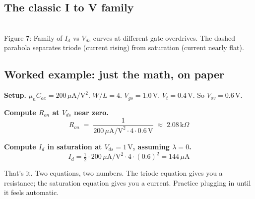 \documentclass[11pt]{article}
\begin{document}
\subsection{The classic I to V family}

\begin{center}
\\
{\small Figure 7: Family of $I_d$ vs $V_{ds}$ curves at different gate overdrives. The dashed parabola separates triode (current rising) from saturation (current nearly flat).}
\end{center}

\subsection{Worked example: just the math, on paper}

\textbf{Setup.} $\mu_n C_{ox} = 200\,\mu\text{A}/\text{V}^2$. $W/L = 4$. $V_{gs} = 1.0\,\text{V}$. $V_t = 0.4\,\text{V}$. So $V_{ov} = 0.6\,\text{V}$.

\textbf{Compute $R_{on}$ at $V_{ds}$ near zero.}
\[
R_{on} \;=\; \frac{1}{200\,\mu\text{A}/\text{V}^2 \cdot 4 \cdot 0.6\,\text{V}} \;\approx\; 2.08\,\text{k}\Omega
\]

\textbf{Compute $I_d$ in saturation at $V_{ds} = 1\,\text{V}$, assuming $\lambda = 0$.}
\[
I_d = \tfrac{1}{2} \cdot 200\,\mu\text{A}/\text{V}^2 \cdot 4 \cdot (0.6)^2 = 144\,\mu\text{A}
\]

That's it. Two equations, two numbers. The triode equation gives you a resistance; the saturation equation gives you a current. Practice plugging in until it feels automatic.
\end{document}
